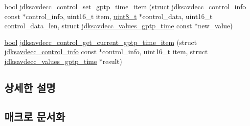 \begin{DoxyCompactItemize}
\item 
\hyperlink{avb__gptp_8h_af6a258d8f3ee5206d682d799316314b1}{bool} \hyperlink{group__aem__control__value__helpers_ga97323a2ca3fed02548700c287dc0b58f}{jdksavdecc\+\_\+control\+\_\+set\+\_\+gptp\+\_\+time\+\_\+item} (struct \hyperlink{structjdksavdecc__control__info}{jdksavdecc\+\_\+control\+\_\+info} const $\ast$control\+\_\+info, uint16\+\_\+t item, \hyperlink{stdint_8h_aba7bc1797add20fe3efdf37ced1182c5}{uint8\+\_\+t} $\ast$control\+\_\+data, uint16\+\_\+t control\+\_\+data\+\_\+len, struct \hyperlink{structjdksavdecc__values__gptp__time}{jdksavdecc\+\_\+values\+\_\+gptp\+\_\+time} const $\ast$new\+\_\+value)
\item 
\hyperlink{avb__gptp_8h_af6a258d8f3ee5206d682d799316314b1}{bool} \hyperlink{group__aem__control__value__helpers_ga02053c9d8620ad94bf06f171fff79df8}{jdksavdecc\+\_\+control\+\_\+get\+\_\+current\+\_\+gptp\+\_\+time\+\_\+item} (struct \hyperlink{structjdksavdecc__control__info}{jdksavdecc\+\_\+control\+\_\+info} const $\ast$control\+\_\+info, uint16\+\_\+t item, struct \hyperlink{structjdksavdecc__values__gptp__time}{jdksavdecc\+\_\+values\+\_\+gptp\+\_\+time} $\ast$result)
\end{DoxyCompactItemize}


\subsection{상세한 설명}


\subsection{매크로 문서화}
